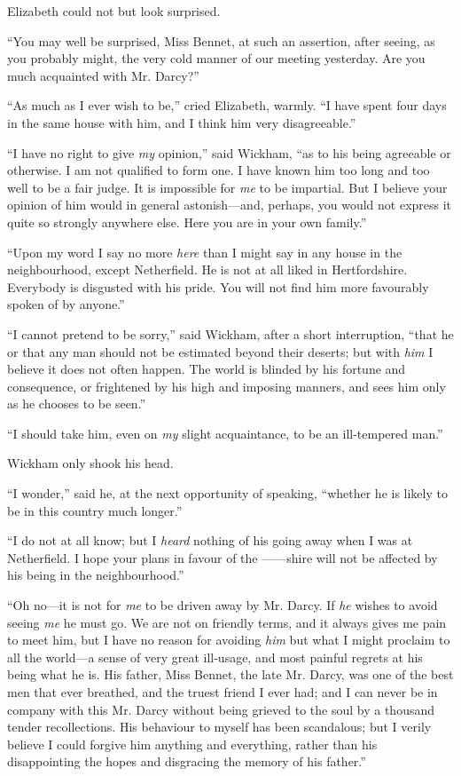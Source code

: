 Elizabeth could not but look surprised.

``You may well be surprised, Miss Bennet, at such an assertion, after seeing, as you probably might, the very cold manner of our meeting yesterday. Are you much acquainted with Mr. Darcy?''

``As much as I ever wish to be,'' cried Elizabeth, warmly. ``I have spent four days in the same house with him, and I think him very disagreeable.''

``I have no right to give \textit{my} opinion,'' said Wickham, ``as to his being agreeable or otherwise. I am not qualified to form one. I have known him too long and too well to be a fair judge. It is impossible for \textit{me} to be impartial. But I believe your opinion of him would in general astonish---and, perhaps, you would not express it quite so strongly anywhere else. Here you are in your own family.''

``Upon my word I say no more \textit{here} than I might say in any house in the neighbourhood, except Netherfield. He is not at all liked in Hertfordshire. Everybody is disgusted with his pride. You will not find him more favourably spoken of by anyone.''

``I cannot pretend to be sorry,'' said Wickham, after a short interruption, ``that he or that any man should not be estimated beyond their deserts; but with \textit{him} I believe it does not often happen. The world is blinded by his fortune and consequence, or frightened by his high and imposing manners, and sees him only as he chooses to be seen.''

``I should take him, even on \textit{my} slight acquaintance, to be an ill-tempered man.''

Wickham only shook his head.

``I wonder,'' said he, at the next opportunity of speaking, ``whether he is likely to be in this country much longer.''

``I do not at all know; but I \textit{heard} nothing of his going away when I was at Netherfield. I hope your plans in favour of the ------shire will not be affected by his being in the neighbourhood.''

``Oh no---it is not for \textit{me} to be driven away by Mr. Darcy. If \textit{he} wishes to avoid seeing \textit{me} he must go. We are not on friendly terms, and it always gives me pain to meet him, but I have no reason for avoiding \textit{him} but what I might proclaim to all the world---a sense of very great ill-usage, and most painful regrets at his being what he is. His father, Miss Bennet, the late Mr. Darcy, was one of the best men that ever breathed, and the truest friend I ever had; and I can never be in company with this Mr. Darcy without being grieved to the soul by a thousand tender recollections. His behaviour to myself has been scandalous; but I verily believe I could forgive him anything and everything, rather than his disappointing the hopes and disgracing the memory of his father.''


